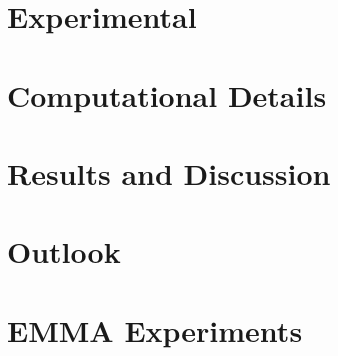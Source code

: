 \documentclass[a4paper,titlepage]{scrreprt}
\begin{document}
\chapter{Experimental}
\label{sec:exp}
%

\chapter{Computational Details}
\label{sec:comp}
%

\chapter{Results and Discussion}
\label{sec:results}
%
%



\chapter{Outlook}
\label{sec:outlook}
%




\clearpage

\appendix
\chapter{EMMA Experiments}
\label{sec:app-emma}

\end{document}
